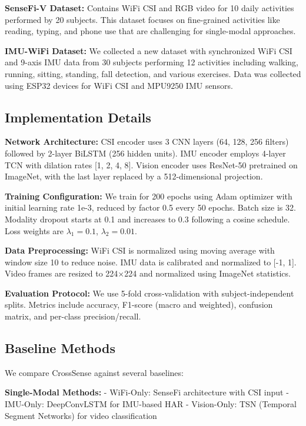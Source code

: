 \documentclass[10pt,twocolumn]{article}
\begin{document}
\textbf{SenseFi-V Dataset:} Contains WiFi CSI and RGB video for 10 daily activities performed by 20 subjects. This dataset focuses on fine-grained activities like reading, typing, and phone use that are challenging for single-modal approaches.

\textbf{IMU-WiFi Dataset:} We collected a new dataset with synchronized WiFi CSI and 9-axis IMU data from 30 subjects performing 12 activities including walking, running, sitting, standing, fall detection, and various exercises. Data was collected using ESP32 devices for WiFi CSI and MPU9250 IMU sensors.

\subsection{Implementation Details}

\textbf{Network Architecture:} CSI encoder uses 3 CNN layers (64, 128, 256 filters) followed by 2-layer BiLSTM (256 hidden units). IMU encoder employs 4-layer TCN with dilation rates [1, 2, 4, 8]. Vision encoder uses ResNet-50 pretrained on ImageNet, with the last layer replaced by a 512-dimensional projection.

\textbf{Training Configuration:} We train for 200 epochs using Adam optimizer with initial learning rate 1e-3, reduced by factor 0.5 every 50 epochs. Batch size is 32. Modality dropout starts at 0.1 and increases to 0.3 following a cosine schedule. Loss weights are $\lambda_1 = 0.1$, $\lambda_2 = 0.01$.

\textbf{Data Preprocessing:} WiFi CSI is normalized using moving average with window size 10 to reduce noise. IMU data is calibrated and normalized to [-1, 1]. Video frames are resized to 224×224 and normalized using ImageNet statistics.

\textbf{Evaluation Protocol:} We use 5-fold cross-validation with subject-independent splits. Metrics include accuracy, F1-score (macro and weighted), confusion matrix, and per-class precision/recall.

\subsection{Baseline Methods}

We compare CrossSense against several baselines:

\textbf{Single-Modal Methods:}
- WiFi-Only: SenseFi architecture with CSI input
- IMU-Only: DeepConvLSTM for IMU-based HAR
- Vision-Only: TSN (Temporal Segment Networks) for video classification
\end{document}
